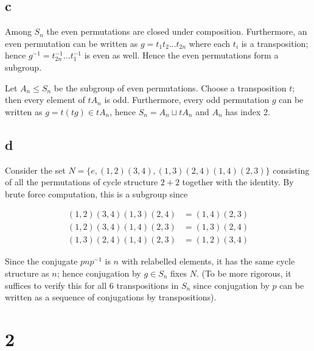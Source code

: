 \documentclass{article}
\def\inv{{-1}}
\begin{document}
\subsection*{c}

Among $S_n$ the even permutations are closed under composition. Furthermore, an even permutation can be written as $g = t_1 t_2 \ldots t_{2n}$ where each $t_i$ is a transposition; hence $g^\inv = t_{2n}^\inv \ldots t_1^\inv$ is even as well. Hence the even permutations form a subgroup. 

Let $A_n \le S_n$ be the subgroup of even permutations. Choose a transposition $t$; then every element of $tA_n$ is odd. Furthermore, every odd permutation $g$ can be written as $g = t (t g) \in tA_n$, hence $S_n = A_n \sqcup tA_n$ and $A_n$ has index 2.

\subsection*{d}

Consider the set $N = \{e, (1, 2)(3, 4), (1, 3)(2, 4) (1, 4)(2, 3)\}$ consisting of all the permutations of cycle structure $2+2$ together with the identity. By brute force computation, this is a subgroup since

\begin{align*}
(1, 2)(3, 4)(1, 3)(2, 4) &= (1,4)(2,3) \\
(1, 2)(3, 4)(1, 4)(2, 3) &= (1,3)(2,4) \\
(1, 3)(2, 4)(1, 4)(2, 3) &= (1,2)(3,4)
\end{align*}

Since the conjugate $pnp^\inv$ is $n$ with relabelled elements, it has the same cycle structure as $n$; hence conjugation by $g \in S_n$ fixes $N$. (To be more rigorous, it suffices to verify this for all 6 transpositions in $S_n$ since conjugation by $p$ can be written as a sequence of conjugations by transpositions).

\section*{2}

\end{document}
